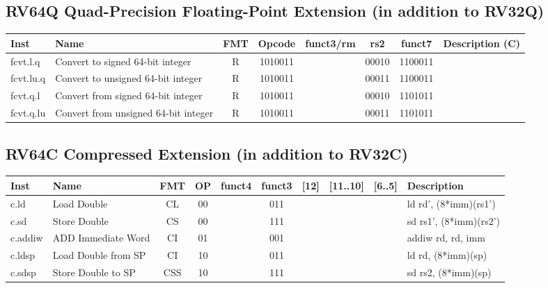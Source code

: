 \subsection*{RV64Q Quad-Precision Floating-Point Extension (in addition to RV32Q)}
\begin{center}

\begin{tabular}
{T | l | c | c | c | c | c | T} \hline
\rm Inst & Name                    & FMT & \rm Opcode & \rm funct3/rm & \rm rs2 & \rm funct7 & \rm Description (C)          \\ \hline
fcvt.l.q    & Convert to signed 64-bit integer     & R   & 1010011  &      & 00010    & 1100011   &                \\
fcvt.lu.q   & Convert to unsigned 64-bit integer   & R   & 1010011  &      & 00011    & 1100011   &                \\
fcvt.q.l    & Convert from signed 64-bit integer   & R   & 1010011  &      & 00010    & 1101011   &               \\
fcvt.q.lu   & Convert from unsigned 64-bit integer & R   & 1010011  &      & 00011    & 1101011   &               \\

\end{tabular}
\end{center}


\subsection*{RV64C Compressed Extension (in addition to RV32C)}

\begin{center}
\begin{tabular}
{T | l | c | c | c | c | c | c | c | T } \hline
\rm Inst   & Name                    & FMT & \rm OP & \rm funct4 & \rm funct3 & \rm [12] & \rm [11..10] & \rm [6..5] & \rm Description          \\ \hline
c.ld       & Load Double             & CL  & 00     & & 011 & & &       & ld rd', (8*imm)(rs1')    \\
c.sd       & Store Double            & CS  & 00     & & 111 & & &       & sd rs1', (8*imm)(rs2')   \\
c.addiw    & ADD Immediate Word      & CI  & 01     & & 001 & & &       & addiw rd, rd, imm        \\
c.ldsp     & Load Double from SP     & CI  & 10     & & 011 & & &       & ld rd, (8*imm)(sp)       \\
c.sdsp     & Store Double to SP      & CSS & 10     & & 111 & & &       & sd rs2, (8*imm)(sp)      \\
\hline
\end{tabular}
\end{center}
    
